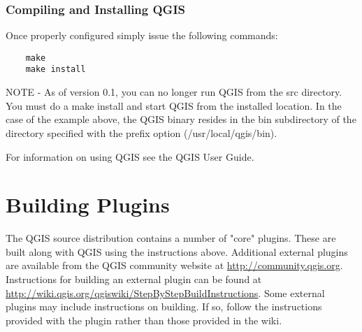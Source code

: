   \subsubsection{Compiling and Installing QGIS}
  Once properly configured simply issue the following commands:
  \begin{verbatim}
    make
    make install
  \end{verbatim}
NOTE - As of version 0.1, you can no longer run QGIS from the src directory. You must do a make install and start QGIS from the installed location. In the case of the example above, the QGIS binary resides in the bin subdirectory of the directory specified with the prefix option (/usr/local/qgis/bin).

For information on using QGIS see the QGIS User Guide.

\section{Building Plugins}
The QGIS source distribution contains a number of "core" plugins. These are built along with QGIS using the instructions above. Additional external plugins are available from the QGIS community website at \url{http://community.qgis.org}. Instructions for building an external plugin can be found at \url{http://wiki.qgis.org/qgiswiki/StepByStepBuildInstructions}. Some external plugins may include instructions on building. If so, follow the instructions provided with the plugin rather than those provided in the wiki. 
